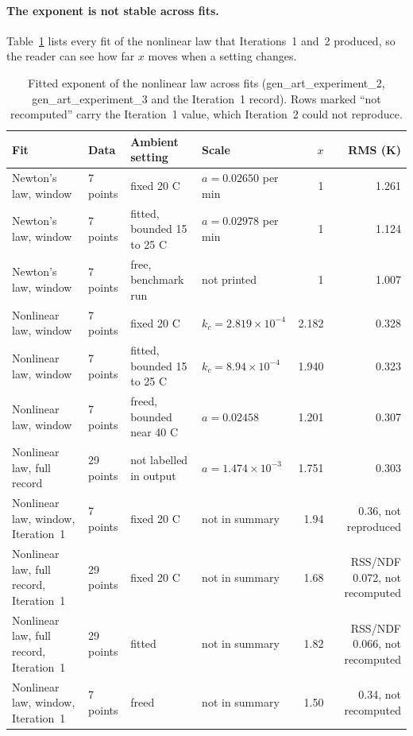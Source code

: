 \documentclass[11pt,letterpaper]{article}
\begin{document}
\paragraph{The exponent is not stable across fits.} Table~\ref{tab:it2-exponent} lists every fit of the nonlinear law that Iterations~1 and~2 produced, so the reader can see how far $x$ moves when a setting changes.

\begin{table}[!htbp]
\centering
\small
\caption{Fitted exponent of the nonlinear law across fits (gen\_art\_experiment\_2, gen\_art\_experiment\_3 and the Iteration~1 record). Rows marked ``not recomputed'' carry the Iteration~1 value, which Iteration~2 could not reproduce.}
\label{tab:it2-exponent}
\begin{tabularx}{\linewidth}{p{3.6cm}p{2.4cm}p{2.4cm}Xrr}
\toprule
Fit & Data & Ambient setting & Scale & $x$ & RMS (K) \\
\midrule
Newton's law, window & 7 points & fixed 20 C & $a = 0.02650$ per min & 1 & 1.261 \\
Newton's law, window & 7 points & fitted, bounded 15 to 25 C & $a = 0.02978$ per min & 1 & 1.124 \\
Newton's law, window & 7 points & free, benchmark run & not printed & 1 & 1.007 \\
Nonlinear law, window & 7 points & fixed 20 C & $k_c = 2.819\times10^{-4}$ & 2.182 & 0.328 \\
Nonlinear law, window & 7 points & fitted, bounded 15 to 25 C & $k_c = 8.94\times10^{-4}$ & 1.940 & 0.323 \\
Nonlinear law, window & 7 points & freed, bounded near 40 C & $a = 0.02458$ & 1.201 & 0.307 \\
Nonlinear law, full record & 29 points & not labelled in output & $a = 1.474\times10^{-3}$ & 1.751 & 0.303 \\
Nonlinear law, window, Iteration~1 & 7 points & fixed 20 C & not in summary & 1.94 & 0.36, not reproduced \\
Nonlinear law, full record, Iteration~1 & 29 points & fixed 20 C & not in summary & 1.68 & RSS/NDF 0.072, not recomputed \\
Nonlinear law, full record, Iteration~1 & 29 points & fitted & not in summary & 1.82 & RSS/NDF 0.066, not recomputed \\
Nonlinear law, window, Iteration~1 & 7 points & freed & not in summary & 1.50 & 0.34, not recomputed \\
\bottomrule
\end{tabularx}
\end{table}
\end{document}
